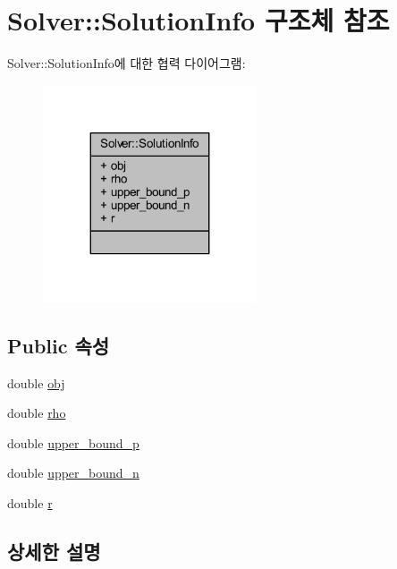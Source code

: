 \hypertarget{struct_solver_1_1_solution_info}{\section{Solver\+:\+:Solution\+Info 구조체 참조}
\label{struct_solver_1_1_solution_info}
}


Solver\+:\+:Solution\+Info에 대한 협력 다이어그램\+:
\nopagebreak
\begin{figure}[H]
\begin{center}
\leavevmode
\includegraphics[width=179pt]{struct_solver_1_1_solution_info__coll__graph}
\end{center}
\end{figure}
\subsection*{Public 속성}
\begin{DoxyCompactItemize}
\item 
double \hyperlink{struct_solver_1_1_solution_info_adf1d775e9152a7b1742057cd638ed2ae}{obj}
\item 
double \hyperlink{struct_solver_1_1_solution_info_a8091f45a336af39e232f3845e25f2266}{rho}
\item 
double \hyperlink{struct_solver_1_1_solution_info_a94c4cb7f402752326cc975ec57a8688f}{upper\+\_\+bound\+\_\+p}
\item 
double \hyperlink{struct_solver_1_1_solution_info_a07ab9dc3265855f483922988bdaaf986}{upper\+\_\+bound\+\_\+n}
\item 
double \hyperlink{struct_solver_1_1_solution_info_a3db948f9e914e1f9976523cfdc7c1bbe}{r}
\end{DoxyCompactItemize}


\subsection{상세한 설명}


